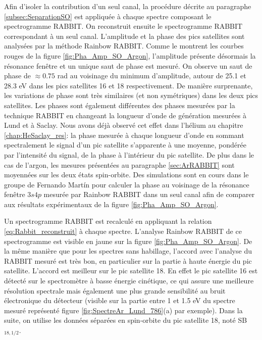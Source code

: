 Afin d'isoler la contribution d'un seul canal, la procédure décrite au paragraphe \ref{subsec:SeparationSO} est appliquée à chaque spectre composant le spectrogramme RABBIT. On reconstruit ensuite le spectrogramme RABBIT correspondant à un seul canal. L'amplitude et la phase des pics satellites sont analysées par la méthode Rainbow RABBIT. Comme le montrent les courbes rouges de la figure \ref{fig:Pha_Amp_SO_Argon}, l'amplitude présente désormais la résonance fenêtre et un unique saut de phase est mesuré. On observe un saut de phase de $\approx 0.75$ rad au voisinage du minimum d'amplitude, autour de 25.1 et 28.3 eV dans les pics satellites 16 et 18 respectivement. De manière surprenante, les variations de phase sont très similaires (et non symétriques) dans les deux pics satellites. Les phases sont également différentes des phases mesurées par la technique RABBIT en changeant la longueur d'onde de génération mesurées à Lund  et à Saclay. Nous avons déjà observé cet effet dans l'hélium au chapitre \ref{chap:HeSaclay_res}: la phase mesurée à chaque longueur d'onde en sommant spectralement le signal d'un pic satellite s'apparente à une moyenne, pondérée par l'intensité du signal, de la phase à l'intérieur du pic satellite. De plus dans le cas de l'argon, les mesures présentées au paragraphe \ref{sec:ArRABBIT} sont moyennées sur les deux états spin-orbite. Des simulations sont en cours dans le groupe de Fernando Mart\'{i}n pour calculer la phase au voisinage de la résonance fenêtre $3s4p$ mesurée par Rainbow RABBIT dans un seul canal afin de comparer aux résultats expérimentaux de la figure \ref{fig:Pha_Amp_SO_Argon}.

Un spectrogramme RABBIT est recalculé en appliquant la relation \ref{eq:Rabbit_reconstruit} à chaque spectre. L'analyse Rainbow RABBIT de ce spectrogramme est visible en jaune sur la figure \ref{fig:Pha_Amp_SO_Argon}. De la même manière que pour les spectres sans habillage, l'accord avec l'analyse du RABBIT mesuré est très bon, en particulier sur la partie à haute énergie du pic satellite. L'accord est meilleur sur le pic satellite 18. En effet le pic satellite 16 est détecté sur le spectromètre à basse énergie cinétique, ce qui assure une meilleure résolution spectrale mais également une plus grande sensibilité au bruit électronique du détecteur (visible sur la partie entre 1 et 1.5 eV du spectre mesuré représenté figure \ref{fig:SpectreAr_Lund_786}(a) par exemple). Dans la suite, on utilise les données séparées en spin-orbite du pic satellite 18, noté SB$_{18,1/2}$.

